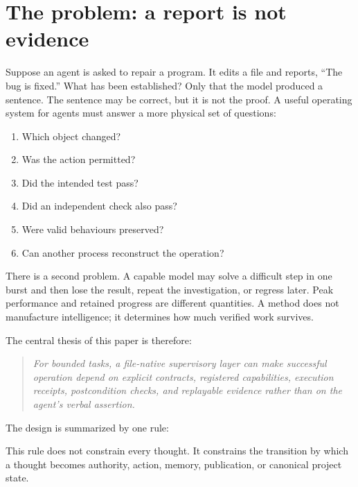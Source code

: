 \documentclass[10pt,twocolumn]{article}
\theoremstyle{definition}
\theoremstyle{plain}
\theoremstyle{remark}
\begin{document}
\section{The problem: a report is not evidence}

Suppose an agent is asked to repair a program.  It edits a file and reports, ``The bug is fixed.''  What has been established?  Only that the model produced a sentence.  The sentence may be correct, but it is not the proof.  A useful operating system for agents must answer a more physical set of questions:

\begin{enumerate}
  \item Which object changed?
  \item Was the action permitted?
  \item Did the intended test pass?
  \item Did an independent check also pass?
  \item Were valid behaviours preserved?
  \item Can another process reconstruct the operation?
\end{enumerate}

There is a second problem.  A capable model may solve a difficult step in one burst and then lose the result, repeat the investigation, or regress later.  Peak performance and retained progress are different quantities.  A method does not manufacture intelligence; it determines how much verified work survives.

The central thesis of this paper is therefore:

\begin{quote}
\emph{For bounded tasks, a file-native supervisory layer can make successful operation depend on explicit contracts, registered capabilities, execution receipts, postcondition checks, and replayable evidence rather than on the agent's verbal assertion.}
\end{quote}

The design is summarized by one rule:

\begin{center}
\end{center}

This rule does not constrain every thought.  It constrains the transition by which a thought becomes authority, action, memory, publication, or canonical project state.
\end{document}

